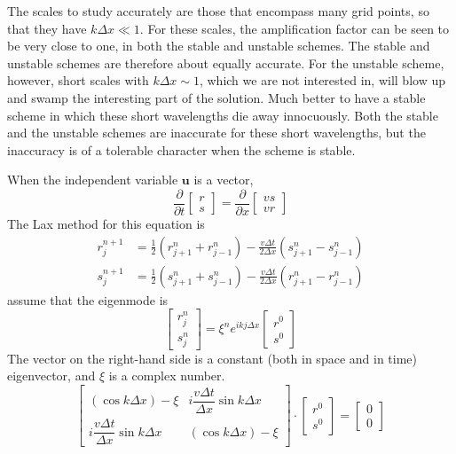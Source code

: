 \documentclass[12pt,a4paper]{article}
\renewcommand{\vec}[1]{\boldsymbol{#1}}
\begin{document}
 The scales to study accurately are those that encompass many grid points, so that they have $k\Delta x \ll 1$. For these scales, the amplification factor can be seen to be very close to one, in both the stable and unstable schemes. The stable and unstable schemes are therefore about equally accurate. For the unstable scheme, however, short scales with $k\Delta x \sim 1$, which we are not interested in, will blow up and swamp the interesting part of the solution. Much better to have a stable scheme in which these short wavelengths die away innocuously. Both the stable and the unstable schemes are inaccurate for these short wavelengths, but the inaccuracy is of a tolerable character when the scheme is stable.

When the independent variable $\vec{u}$ is a vector,
\begin{equation}
\frac{\partial }{\partial t}
\begin{bmatrix}
r \\ 
s
\end{bmatrix}
= \frac{\partial }{\partial x}
\begin{bmatrix}
vs \\ 
vr
\end{bmatrix}
\label{u_vector}
\end{equation}
The Lax method for this equation is
\begin{align}
r_{j}^{n+1} &=\frac{1}{2} (r^n_{j+1} +r^n_{j-1}) -\frac{v\Delta t }{2\Delta x}\left(s_{j+1}^{n} -s_{j-1}^{n} \right) \\
s_{j}^{n+1} &=\frac{1}{2} (s^n_{j+1} +s^n_{j-1}) -\frac{v\Delta t }{2\Delta x}\left(r_{j+1}^{n} -r_{j-1}^{n} \right)
\end{align}
assume that the eigenmode is
\begin{equation}
\begin{bmatrix}
r_j^n \\ 
s_j^n
\end{bmatrix}
= \xi^n e^{ikj\Delta x} 
\begin{bmatrix}
r^0 \\ 
s^0
\end{bmatrix}
\end{equation}
The vector on the right-hand side is a constant (both in space and in time) eigenvector, and $\xi$ is a complex number.
\begin{equation}
\begin{bmatrix}
(\cos k\Delta x) -\xi & i\dfrac{v\Delta t }{\Delta x} \sin k\Delta x \\ 
i\dfrac{v\Delta t }{\Delta x} \sin k\Delta x & (\cos k\Delta x) -\xi
\end{bmatrix}
\cdot
\begin{bmatrix}
r^0 \\ 
s^0
\end{bmatrix}
=
\begin{bmatrix}
0 \\ 
0
\end{bmatrix}
\end{equation}
\end{document}

